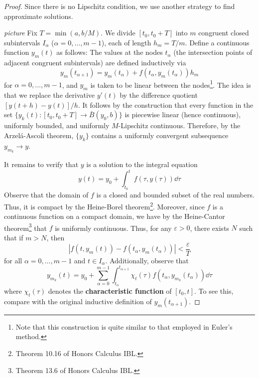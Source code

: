 \documentclass[../notes.tex]{subfiles}
\begin{document}
\begin{itemize}
\begin{proof}
        Since there is no Lipschitz condition, we use another strategy to find approximate solutions.\par
        \emph{picture}
        Fix $T=\min(a,b/M)$. We divide $[t_0,t_0+T]$ into $m$ congruent closed subintervals $I_\alpha$ ($\alpha=0,\dots,m-1$), each of length $h_m=T/m$. Define a continuous function $y_m(t)$ as follows: The values at the nodes $t_\alpha$ (the intersection points of adjacent congruent subintervals) are defined inductively via
        \begin{equation*}
            y_m(t_{\alpha+1}) = y_m(t_\alpha)+f(t_\alpha,y_m(t_\alpha))h_m
        \end{equation*}
        for $\alpha=0,\dots,m-1$, and $y_m$ is taken to be linear between the nodes\footnote{Note that this construction is quite similar to that employed in Euler's method.}. The idea is that we replace the derivative $y'(t)$ by the difference quotient $[y(t+h)-y(t)]/h$. It follows by the construction that every function in the set $\{y_k(t):[t_0,t_0+T]\to\bar{B}(y_0,b)\}$ is piecewise linear (hence continuous), uniformly bounded, and uniformly $M$-Lipschitz continuous. Therefore, by the Arzel\'{a}-Ascoli theorem, $\{y_k\}$ contains a uniformly convergent subsequence $y_{m_k}\to y$.\par
        It remains to verify that $y$ is a solution to the integral equation
        \begin{equation*}
            y(t) = y_0+\int_{t_0}^tf(\tau,y(\tau))\dd\tau
        \end{equation*}
        Observe that the domain of $f$ is a closed and bounded subset of the real numbers. Thus, it is compact by the Heine-Borel theorem\footnote{Theorem 10.16 of Honors Calculus IBL.}. Moreover, since $f$ is a continuous function on a compact domain, we have by the Heine-Cantor theorem\footnote{Theorem 13.6 of Honors Calculus IBL.} that $f$ is uniformly continuous. Thus, for any $\varepsilon>0$, there exists $N$ such that if $m>N$, then
        \begin{equation*}
            |f(t,y_m(t))-f(t_\alpha,y_m(t_\alpha))| < \frac{\varepsilon}{T}
        \end{equation*}
        for all $\alpha=0,\dots,m-1$ and $t\in I_\alpha$. Additionally, observe that
        \begin{equation*}
            y_{m_k}(t) = y_0+\sum_{\alpha=0}^{m-1}\int_{t_\alpha}^{t_{\alpha+1}}\chi_t(\tau)f(t_\alpha,y_{m_k}(t_\alpha))\dd\tau
        \end{equation*}
        where $\chi_t(\tau)$ denotes the \textbf{characteristic function} of $[t_0,t]$. To see this, compare with the original inductive definition of $y_m(t_{\alpha+1})$.

\end{proof}
\end{itemize}
\end{document}
